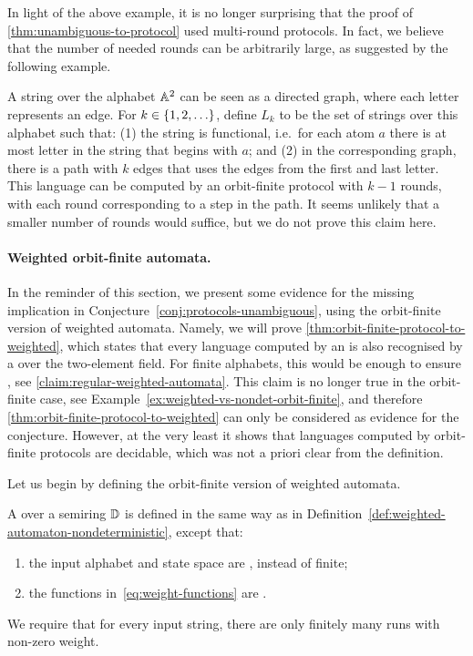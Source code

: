 In light of the above example, it is no longer surprising that the proof of
\cref{thm:unambiguous-to-protocol} used multi-round protocols. In fact, we
believe that the number of needed rounds can be arbitrarily large, as suggested
by the following example. 

\begin{myexample}
    A string over the alphabet $\mathbb A^2$ can be seen as a directed graph, where each letter represents an edge. For $k \in \{1,2,\ldots\}$, define  $L_k$ to be the set of strings over this alphabet such that: (1) the string is functional, i.e.~for each atom $a$ there is at most letter in the string that begins with $a$; and (2) in the corresponding graph, there is a path with $k$ edges that uses the edges from the first and last letter. This language can be computed by an orbit-finite protocol with $k-1$ rounds, with each round corresponding to a step in the path. It seems unlikely that a smaller number of rounds would suffice, but we do not prove this claim here. 
\end{myexample}



\paragraph*{Weighted orbit-finite automata.} In the reminder of this section,
we present some evidence for the missing implication in
Conjecture~\ref{conj:protocols-unambiguous}, using the orbit-finite version of
weighted automata. Namely, we will prove
\cref{thm:orbit-finite-protocol-to-weighted}, which states that every language
computed by an  is also recognised by a  over the two-element field. For finite alphabets, this
would be enough to ensure , see
\cref{claim:regular-weighted-automata}. This claim is no longer true in the
orbit-finite case, see Example~\ref{ex:weighted-vs-nondet-orbit-finite}, and
therefore \cref{thm:orbit-finite-protocol-to-weighted} can only be considered
as evidence for the conjecture. However, at the very least it shows that
languages computed by orbit-finite protocols are decidable, which was not a
priori clear from the definition.

Let us begin by defining the orbit-finite version of weighted automata. 
\begin{definition}
    \label{def:weighted-orbit-finite-automata}
    \AP
    A  over a semiring $\mathbb D$ is 
    defined in the same way as in Definition~\ref{def:weighted-automaton-nondeterministic}, except that:
    \begin{enumerate}
      \item the input alphabet and state space are , instead of finite;
      \item the functions in~\eqref{eq:weight-functions} are .
    \end{enumerate}
     We require that for every input string, there are only finitely many runs with non-zero weight.
\end{definition}

